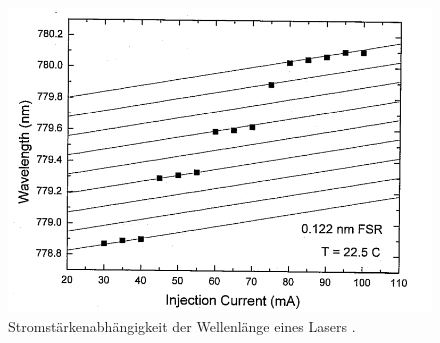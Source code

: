 \begin{figure}[H]
    \centering
    \includegraphics[scale=0.8]{pictures/Strom.png}
    \caption{Stromstärkenabhängigkeit der Wellenlänge eines Lasers \cite{teachspin}.}
    \label{fig:Strom}
\end{figure}

